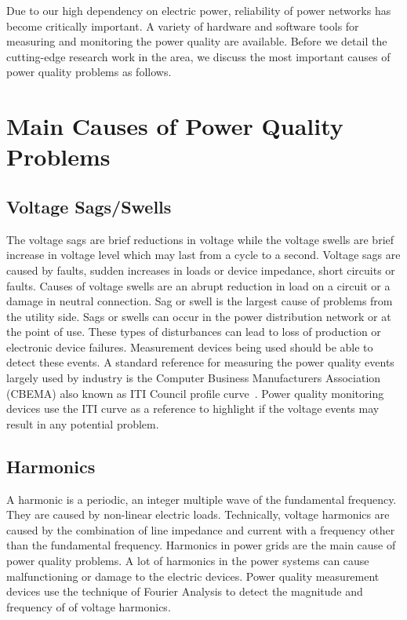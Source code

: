\label{chap:review}
Due to our high dependency on electric power, reliability of power networks has become critically important. A variety of hardware and software tools for measuring and monitoring the power quality are available. Before we detail the cutting-edge research work in the area, we discuss the most important causes of power quality problems as follows.

\section{Main Causes of Power Quality Problems}
\subsection{Voltage Sags/Swells}
The voltage sags are brief reductions in voltage while the voltage swells are brief increase in voltage level which may last from a cycle to a second. Voltage sags are caused by faults, sudden increases in loads or device impedance, short circuits or faults. Causes of voltage swells are an abrupt reduction in load on a circuit or a damage in neutral connection. Sag or swell is the largest cause of problems from the utility side. Sags or swells can occur in the power distribution network or at the point of use. These types of disturbances can lead to loss of production or electronic device failures. Measurement devices being used should be able to detect these events. A standard reference for measuring the power quality events largely used by industry is the Computer Business Manufacturers Association (CBEMA) also known as ITI Council profile curve~\cite{iti_curve}. Power quality monitoring devices use the ITI curve as a reference to highlight if the voltage events may result in any potential problem.

\subsection{Harmonics}
A harmonic is a periodic, an integer multiple wave of the fundamental frequency. They are caused by non-linear electric loads. Technically, voltage harmonics are caused by the combination of line impedance and current with a frequency other than the fundamental frequency. Harmonics in power grids are the main cause of power quality problems. A lot of harmonics in the power systems can cause malfunctioning or damage to the electric devices. Power quality measurement devices use the technique of Fourier Analysis to detect the magnitude and frequency of of voltage harmonics.

